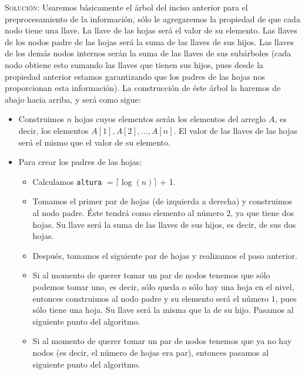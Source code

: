 \documentclass[letterpaper,11pt]{article}
\begin{document}
\begin{enumerate}
\begin{itemize}
        \textsc{Solución:} Usaremos básicamente el árbol del inciso anterior 
        para el preprocesamiento de la información, sólo le agregaremos la 
        propiedad de que cada nodo tiene una llave. La llave de las hojas 
        será el valor de su elemento. Las llaves de los nodos padre de las 
        hojas será la suma de las llaves de sus hijos. Las llaves de los 
        demás nodos internos serán la suma de las llaves de sus subárboles 
        (cada nodo obtiene esto sumando las llaves que tienen sus hijos, 
        pues desde la propiedad anterior estamos garantizando que los padres 
        de las hojas nos proporcionan esta información). La construcción
        de éste árbol la haremos de abajo hacia arriba, y será como sigue:
        \begin{itemize}
            \item Construimos $n$ hojas cuyos elementos serán los elementos del 
            arreglo $A$, es decir, los elementos $A[1], A[2], \ldots, A[n]$.
            El valor de las llaves de las hojas será el mismo que el valor de 
            su elemento. 

            \item Para crear los padres de las hojas:
            \begin{itemize}
                \item Calculamos \texttt{altura} $= \lceil \log(n)\rceil$ + 1. 
    
                \item Tomamos el primer par de hojas (de izquierda a derecha) y 
                construimos al nodo padre. Éste tendrá como elemento al número 
                $2$, ya que tiene dos hojas. Su llave será la suma de las llaves
                de sus hijos, es decir, de sus dos hojas.
    
                \item Después, tomamos el siguiente par de hojas y realizamos el 
                paso anterior. 
                
                \item Si al momento de querer tomar un par de nodos tenemos que 
                sólo podemos tomar uno, es decir, sólo queda o sólo hay una hoja 
                en el nivel, entonces construimos al nodo padre y su elemento 
                será el número $1$, pues sólo tiene una hoja. Su llave será la 
                misma que la de su hijo. Pasamos al siguiente punto del 
                algoritmo.

                \item Si al momento de querer tomar un par de nodos tenemos que 
                ya no hay nodos (es decir, el número de hojas era par), entonces 
                pasamos al siguiente punto del algoritmo.
            \end{itemize}


\end{itemize}
\end{itemize}
\end{enumerate}
\end{document}

